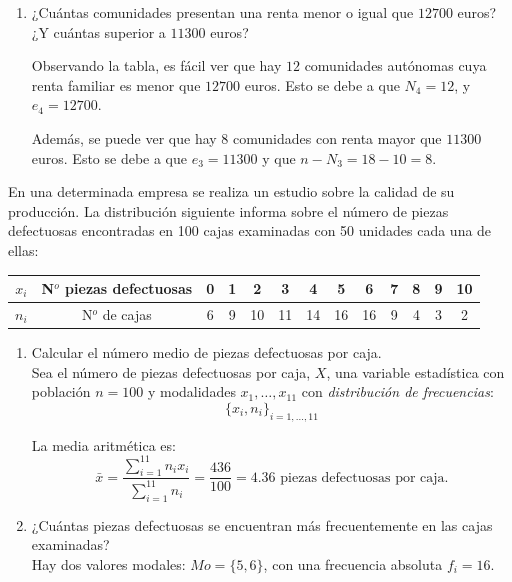 \begin{ejercicio}
\begin{enumerate}
        \item ¿Cuántas comunidades presentan una renta menor o igual que $12700$ euros? ¿Y cuántas superior a $11300$ euros? 

        Observando la tabla, es fácil ver que hay $12$ comunidades autónomas cuya renta familiar es menor que $12700$ euros. Esto se debe a que $N_4=12$, y $e_4=12700$.

        Además, se puede ver que hay $8$ comunidades con renta mayor que $11300$ euros. Esto se debe a que $e_3 = 11300$ y que $n-N_3 = 18-10 = 8$.

    \end{enumerate}
\end{ejercicio}

\begin{ejercicio}
    En una determinada empresa se realiza un estudio sobre la calidad de su producción. La distribución siguiente informa sobre el número de piezas defectuosas encontradas en 100 cajas examinadas con 50 unidades cada una de ellas:
    \begin{table}[H]
        \centering
        \begin{tabular}{c||c||c|c|c|c|c|c|c|c|c|c|c|}
            \hline
            $x_i$ & N$^o$ piezas defectuosas & 0 & 1 & 2 & 3 & 4 & 5 & 6 & 7 & 8 & 9 & 10  \\ \hline
            $n_i$ & N$^o$ de cajas & 6 & 9 & 10 & 11 & 14 & 16 & 16 & 9 & 4 & 3 & 2 \\ \hline
        \end{tabular}
    \end{table}

    \begin{enumerate}
        \item Calcular el número medio de piezas defectuosas por caja.\\
        Sea el número de piezas defectuosas por caja, $X$, una variable estadística con población $n=100$ y modalidades $x_1, \dots, x_11$ con \emph{distribución de frecuencias}:
        $$\{x_i, n_i\}_{i=1, \dots, 11}$$

        La media aritmética es:
        $$\bar{x} = \frac{\sum_{i=1}^{11}n_ix_i}{\sum_{i=1}^{11}n_i} = \frac{436}{100} = 4.36 \text{ piezas defectuosas por caja.}$$

        \item ¿Cuántas piezas defectuosas se encuentran más frecuentemente en las cajas examinadas?\\
        Hay dos valores modales: $Mo=\{5,6\}$, con una frecuencia absoluta $f_i = 16$.


\end{enumerate}
\end{ejercicio}
